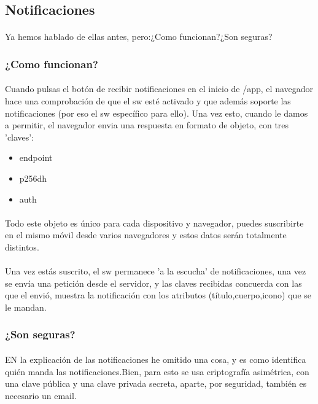 \documentclass[a4paper]{article}
\begin{document}
\subsection[Notificaciones]{Notificaciones}
\paragraph{}
Ya hemos hablado de ellas antes, pero:¿Como funcionan?¿Son seguras?
\subsubsection{¿Como funcionan?}
\paragraph{}
Cuando pulsas el botón de recibir notificaciones en el inicio de /app, 
el navegador hace una comprobación de que el sw esté activado y que además 
soporte las notificaciones (por eso el sw específico para ello). 
Una vez esto, cuando le damos a permitir, el navegador envia una respuesta 
en formato de objeto, con tres 'claves':
\begin{itemize}
   \item endpoint
   \item p256dh
   \item auth
\end{itemize}
\paragraph{}
Todo este objeto es único para cada dispositivo y navegador, 
puedes suscribirte en el mismo móvil desde varios navegadores
 y estos datos serán totalmente distintos.
\paragraph{}
Una vez estás suscrito, el sw permanece 'a la escucha' de notificaciones, una vez se 
envía una petición desde el servidor, y las claves recibidas concuerda con las que 
el envió, muestra la notificación con los atributos (título,cuerpo,icono) que se le mandan.
\subsubsection{¿Son seguras?}
\paragraph{}
EN la explicación de las notificaciones he omitido una cosa, 
y es como identifica quién manda las notificaciones.Bien, para esto se usa 
criptografía asimétrica, con una clave pública y una clave
 privada secreta, aparte, por seguridad, también es necesario un email.
\end{document}
